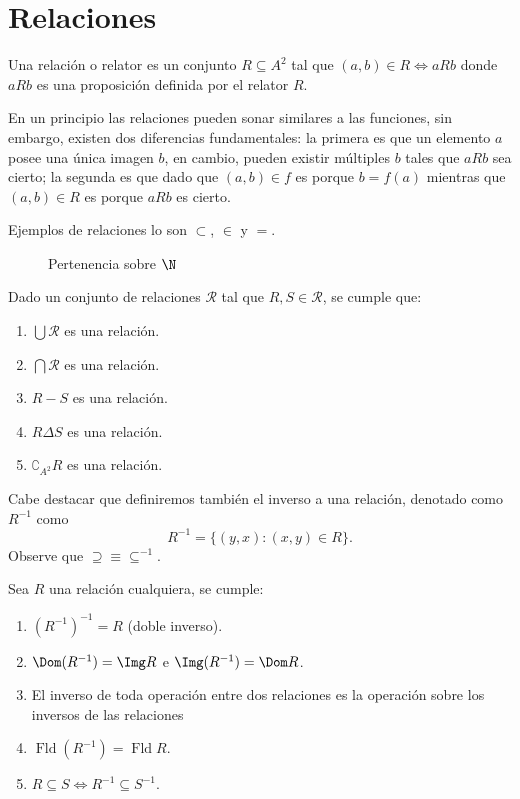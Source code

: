 \documentclass[11pt,oneside,a4paper]{book}
\DeclareMathOperator{\Fld}{Fld}
\begin{document}
\section{Relaciones}
\begin{mydef}
Una relación o relator es un conjunto $R\subseteq A^2$ tal que $(a,b)\in R\iff aRb$ donde $aRb$ es una proposición definida por el relator $R$.
\end{mydef}

En un principio las relaciones pueden sonar similares a las funciones, sin embargo, existen dos diferencias fundamentales: la primera es que un elemento $a$ posee una única imagen $b$, en cambio, pueden existir múltiples $b$ tales que $aRb$ sea cierto; la segunda es que dado que $(a,b)\in f$ es porque $b=f(a)$ mientras que $(a,b)\in R$ es porque $aRb$ es cierto.

Ejemplos de relaciones lo son $\subset$, $\in$ y $=$.

\begin{figure}
\centering
{}
\caption{Pertenencia sobre $\N$}
\end{figure}

\begin{prop}
Dado un conjunto de relaciones $\mathscr{R}$ tal que $R,S\in\mathscr{R}$, se cumple que:
\begin{enumerate}
\item $\bigcup\mathscr{R}$ es una relación.
\item $\bigcap\mathscr{R}$ es una relación.
\item $R-S$ es una relación.
\item $R\Delta S$ es una relación.
\item $\complement_{A^2}R$ es una relación.
\end{enumerate}
\end{prop}

Cabe destacar que definiremos también el inverso a una relación, denotado como $R^{-1}$ como
$$
R^{-1}=\{(y,x):(x,y)\in R\}.
$$
Observe que ${\supseteq}\equiv{\subseteq^{-1}}$.
\begin{prop}
Sea $R$ una relación cualquiera, se cumple:
\begin{enumerate}
\item $(R^{-1})^{-1}=R$ (doble inverso).
\item $\Dom(R^{-1})=\Img R$ e $\Img(R^{-1})=\Dom R$.
\item El inverso de toda operación entre dos relaciones es la operación sobre los inversos de las relaciones
\item $\Fld(R^{-1})=\Fld R$.
\item $R\subseteq S\iff R^{-1}\subseteq S^{-1}$.
\end{enumerate}
\end{prop}
\end{document}
